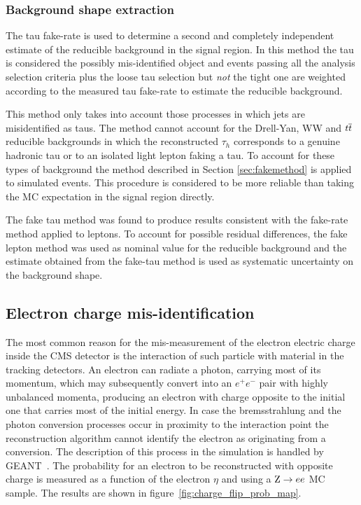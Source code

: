 \subsubsection{Background shape extraction}

The tau fake-rate is used to determine a second and completely independent estimate of the reducible background in the signal region.
In this method the tau is considered the possibly mis-identified object and events passing all the analysis selection criteria plus the loose tau
selection but \emph{not} the tight one are weighted according to the measured tau fake-rate to estimate the reducible background.

This method only takes into account those processes in which jets are misidentified as taus. The method cannot account for the Drell-Yan, WW and $t\overline{t}$ reducible backgrounds
in which the reconstructed $\tau_h$ corresponds to a genuine hadronic tau or to an isolated light lepton faking a tau. To account for these types of background the method described in Section \ref{sec:fakemethod}
is applied to simulated events. This procedure is considered to be more reliable than taking the MC expectation in the signal region directly.

The fake tau method was found to produce results consistent with the fake-rate method applied to leptons. To account for possible residual differences,
the fake lepton method was used as nominal value for the reducible background and the estimate obtained from the fake-tau method is used as systematic uncertainty on the background shape.

\subsection{Electron charge mis-identification}
\label{sec:charge_misid}

The most common reason for the mis-measurement of the electron electric charge inside the CMS detector is the interaction of such particle with material in the tracking detectors. %
An electron can radiate a photon, carrying most of its momentum, which may subsequently convert into an $e^+e^-$ pair with highly unbalanced momenta, producing an electron with charge opposite to the initial one that carries most of the initial energy. %
In case the bremsstrahlung and the photon conversion processes occur 
in proximity to the interaction point the reconstruction algorithm cannot identify the electron as originating from a conversion.
The description of this process in the simulation is handled by \textsc{GEANT}~\cite{geant}. The probability for an electron to be reconstructed with opposite charge is measured as a function of the electron $\eta$ and \pT using a $\mathrm{Z} \rightarrow ee$ MC sample. The results are shown in figure~\ref{fig:charge_flip_prob_map}.


